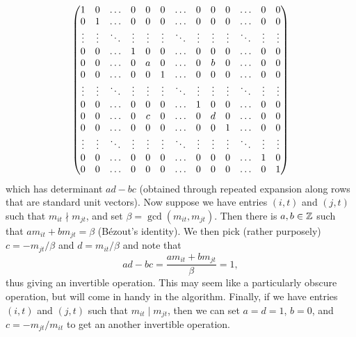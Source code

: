 \[
	\setcounter{MaxMatrixCols}{20}
	\begin{pmatrix}
		1      & 0      & \ldots & 0      & 0      & 0      & \ldots & 0      & 0      & 0      & \ldots & 0      & 0      \\
		0      & 1      & \ldots & 0      & 0      & 0      & \ldots & 0      & 0      & 0      & \ldots & 0      & 0      \\
		\vdots & \vdots & \ddots & \vdots & \vdots & \vdots & \ddots & \vdots & \vdots & \vdots & \ddots & \vdots & \vdots \\
		0      & 0      & \ldots & 1      & 0      & 0      & \ldots & 0      & 0      & 0      & \ldots & 0      & 0      \\
		0      & 0      & \ldots & 0      & a      & 0      & \ldots & 0      & b      & 0      & \ldots & 0      & 0      \\
		0      & 0      & \ldots & 0      & 0      & 1      & \ldots & 0      & 0      & 0      & \ldots & 0      & 0      \\
		\vdots & \vdots & \ddots & \vdots & \vdots & \vdots & \ddots & \vdots & \vdots & \vdots & \ddots & \vdots & \vdots \\
		0      & 0      & \ldots & 0      & 0      & 0      & \ldots & 1      & 0      & 0      & \ldots & 0      & 0      \\
		0      & 0      & \ldots & 0      & c      & 0      & \ldots & 0      & d      & 0      & \ldots & 0      & 0      \\
		0      & 0      & \ldots & 0      & 0      & 0      & \ldots & 0      & 0      & 1      & \ldots & 0      & 0      \\
		\vdots & \vdots & \ddots & \vdots & \vdots & \vdots & \ddots & \vdots & \vdots & \vdots & \ddots & \vdots & \vdots \\
		0      & 0      & \ldots & 0      & 0      & 0      & \ldots & 0      & 0      & 0      & \ldots & 1      & 0      \\
		0      & 0      & \ldots & 0      & 0      & 0      & \ldots & 0      & 0      & 0      & \ldots & 0      & 1      \\
	\end{pmatrix}
	\setcounter{MaxMatrixCols}{10}
\]
which has determinant $ad - bc$ (obtained through repeated expansion along rows that are standard unit vectors). Now suppose we have entries $(i,t)$ and $(j,t)$ such that $m_{it} \nmid m_{jt}$, and set $\beta = \gcd(m_{it}, m_{jt})$. Then there is $a, b \in \mathbb{Z}$ such that $am_{it} + bm_{jt} = \beta$ (B\'ezout's identity). We then pick (rather purposely) $c = -m_{jt}/\beta$ and $d = m_{it}/\beta$ and note that
\[
	ad - bc = \frac{am_{it} + bm_{jt}}{\beta} = 1,
\]
thus giving an invertible operation. This may seem like a particularly obscure operation, but will come in handy in the algorithm. Finally, if we have entries $(i,t)$ and $(j,t)$ such that $m_{it} \mid m_{jt}$, then we can set $a = d = 1$, $b = 0$, and $c = -m_{jt}/m_{it}$ to get an another invertible operation.

